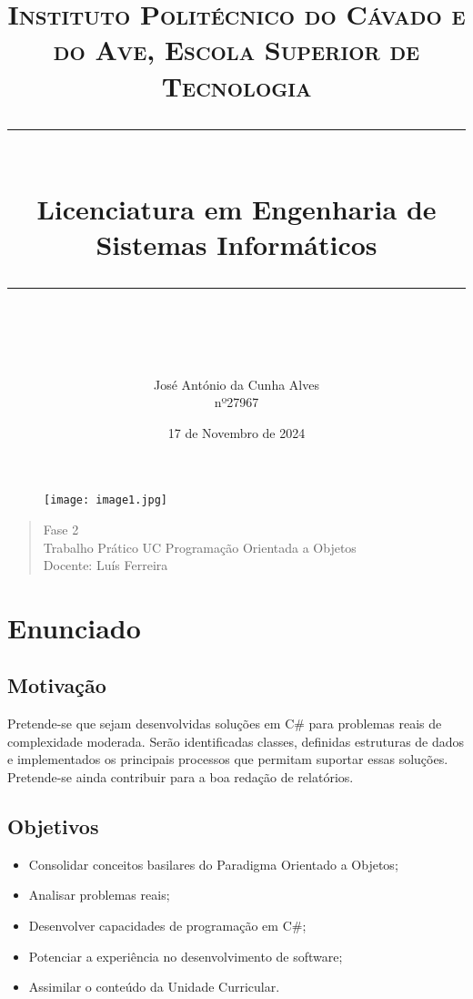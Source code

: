 \documentclass[11pt]{scrartcl} %
\title{	
	\normalfont\normalsize
	\textsc{Instituto Politécnico do Cávado e do Ave, Escola Superior de Tecnologia}\\ %
	\vspace{25pt} %
	\rule{\linewidth}{0.5pt}\\ %
	\vspace{20pt} %
	{\huge Licenciatura em Engenharia de Sistemas Informáticos }\\ %
	\vspace{12pt} %
	\rule{\linewidth}{2pt}\\ %
	\vspace{12pt} %
}
\author{\LARGE José António da Cunha Alves \\ nº27967} %
\date{\normalsize 17 de Novembro de 2024} %
\begin{document}
\maketitle %


\begin{figure}[h] %
	\centering
	\texttt{[image: image1.jpg]} %
\end{figure}

\begin{quote}
	\begin{center}
		Fase 2\\
		\vspace{12pt}
		Trabalho Prático UC Programação Orientada a Objetos\\
		\vspace{12pt}
		Docente: Luís Ferreira
	\end{center}	
\end{quote}
\newpage

\renewcommand{\contentsname}{Conteúdos}
\tableofcontents

\section{Enunciado}
\subsection{Motivação}

Pretende-se que sejam desenvolvidas soluções em C\# para problemas reais de complexidade moderada. Serão identificadas classes, definidas estruturas de dados e implementados os principais processos que permitam suportar essas soluções. Pretende-se ainda contribuir para a boa redação de relatórios.

\subsection{Objetivos}
\begin{itemize}
	\item Consolidar conceitos basilares do Paradigma Orientado a Objetos; 
	\item Analisar problemas reais;
	\item Desenvolver capacidades de programação em C\#;
	\item Potenciar a experiência no desenvolvimento de software;
	\item Assimilar o conteúdo da Unidade Curricular.
\end{itemize}
\end{document}
